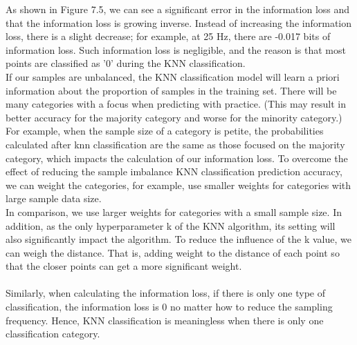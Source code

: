 As shown in Figure 7.5, we can see a significant error in the information loss and that the information loss is growing inverse. Instead of increasing the information loss, there is a slight decrease; for example, at 25 Hz, there are -0.017 bits of information loss. Such information loss is negligible, and the reason is that most points are classified as '0' during the KNN classification.\\

If our samples are unbalanced, the KNN classification model will learn a priori information about the proportion of samples in the training set. There will be many categories with a focus when predicting with practice. (This may result in better accuracy for the majority category and worse for the minority category.) For example, when the sample size of a category is petite, the probabilities calculated after knn classification are the same as those focused on the majority category, which impacts the calculation of our information loss. To overcome the effect of reducing the sample imbalance KNN classification prediction accuracy, we can weight the categories, for example, use smaller weights for categories with large sample data size. \cite{harrington2012machine} \\
In comparison, we use larger weights for categories with a small sample size. In addition, as the only hyperparameter k of the KNN algorithm, its setting will also significantly impact the algorithm. To reduce the influence of the k value, we can weigh the distance. That is, adding weight to the distance of each point so that the closer points can get a more significant weight. \cite{harrington2012machine}
\\ \hspace*{\fill} \\
Similarly, when calculating the information loss, if there is only one type of classification, the information loss is 0 no matter how to reduce the sampling frequency. Hence, KNN classification is meaningless when there is only one classification category.
\\ \hspace*{\fill} \\
